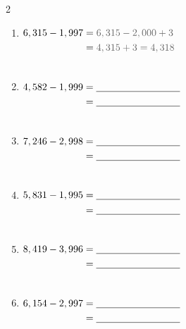 \documentclass{article}
\begin{document}
\begin{multicols}{2}
\begin{enumerate}[label=\textbf{\arabic*.}, itemsep=1.8em, leftmargin=2em]
  \item $\begin{aligned}[t] 6,315 - 1,997 &= {\color{subtext}6,315 - 2,000 + 3} \\ &= {\color{subtext}4,315 + 3 = 4,318} \\ &\vphantom{4,315 + 3 = 4,318}\end{aligned}$
  \item $\begin{aligned}[t] 4,582 - 1,999 &= \underline{\hspace{3cm}} \\ &= \underline{\hspace{3cm}} \\ &\vphantom{4,315 + 3 = 4,318}\end{aligned}$
  \item $\begin{aligned}[t] 7,246 - 2,998 &= \underline{\hspace{3cm}} \\ &= \underline{\hspace{3cm}} \\ &\vphantom{4,315 + 3 = 4,318}\end{aligned}$
  \item $\begin{aligned}[t] 5,831 - 1,995 &= \underline{\hspace{3cm}} \\ &= \underline{\hspace{3cm}} \\ &\vphantom{4,315 + 3 = 4,318}\end{aligned}$
  \item $\begin{aligned}[t] 8,419 - 3,996 &= \underline{\hspace{3cm}} \\ &= \underline{\hspace{3cm}} \\ &\vphantom{4,315 + 3 = 4,318}\end{aligned}$
  \item $\begin{aligned}[t] 6,154 - 2,997 &= \underline{\hspace{3cm}} \\ &= \underline{\hspace{3cm}} \\ &\vphantom{4,315 + 3 = 4,318}\end{aligned}$

\end{enumerate}
\end{multicols}
\end{document}
